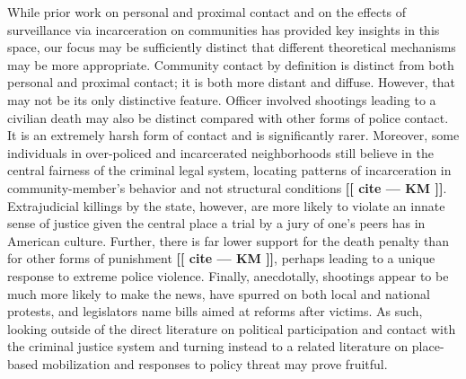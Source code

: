 \documentclass[12pt]{article}
\newcommand{\kmcomment}[1]{\textbf{\textcolor{JungleGreen}{[[ #1 --- KM ]]}}}
\begin{document}
While prior work on personal and proximal contact and on the effects of surveillance via incarceration on communities has provided key insights in this space, our focus may be sufficiently distinct that different theoretical mechanisms may be more appropriate. Community contact by definition is distinct from both personal and proximal contact; it is both more distant and diffuse. However, that may not be its only distinctive feature. Officer involved shootings leading to a civilian death may also be distinct compared with other forms of police contact. It is an extremely harsh form of contact and is significantly rarer. Moreover, some individuals in over-policed and incarcerated neighborhoods still believe in the central fairness of the criminal legal system, locating patterns of incarceration in community-member's behavior and not structural conditions \kmcomment{cite}. Extrajudicial killings by the state, however, are more likely to violate an innate sense of justice given the central place a trial by a jury of one's peers has in American culture. Further, there is far lower support for the death penalty than for other forms of punishment \kmcomment{cite}, perhaps leading to a unique response to extreme police violence. Finally, anecdotally, shootings appear to be much more likely to make the news, have spurred on both local and national protests, and legislators name bills aimed at reforms after victims. As such, looking outside of the direct literature on political participation and contact with the criminal justice system and turning instead to a related literature on place-based mobilization and responses to policy threat may prove fruitful. 
\end{document}

